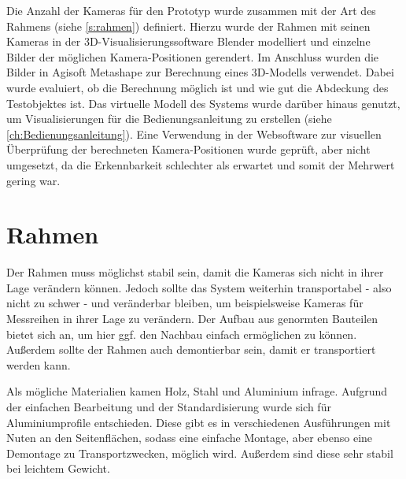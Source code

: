 \documentclass[./00PhotoBox.tex]{subfiles}
\begin{document}
Die Anzahl der Kameras für den Prototyp wurde zusammen mit der Art des Rahmens (siehe \autoref{s:rahmen}) definiert. Hierzu wurde der Rahmen mit seinen Kameras in der 3D-Visualisierungssoftware Blender modelliert und einzelne Bilder der möglichen Kamera-Positionen gerendert. Im Anschluss wurden die Bilder in Agisoft Metashape zur Berechnung eines 3D-Modells verwendet. Dabei wurde evaluiert, ob die Berechnung möglich ist und wie gut die Abdeckung des Testobjektes ist. Das virtuelle Modell des Systems wurde darüber hinaus genutzt, um Visualisierungen für die Bedienungsanleitung zu erstellen (siehe \autoref{ch:Bedienungsanleitung}). Eine Verwendung in der Websoftware zur visuellen Überprüfung der berechneten Kamera-Positionen wurde geprüft, aber nicht umgesetzt, da die Erkennbarkeit schlechter als erwartet und somit der Mehrwert gering war.

\section{Rahmen}
\label{s:rahmen}

Der Rahmen muss möglichst stabil sein, damit die Kameras sich nicht in ihrer Lage verändern können. Jedoch sollte das System weiterhin transportabel - also nicht zu schwer - und veränderbar bleiben, um beispielsweise Kameras für Messreihen in ihrer Lage zu verändern. Der Aufbau aus genormten Bauteilen bietet sich an, um hier ggf. den Nachbau einfach ermöglichen zu können. Außerdem sollte der Rahmen auch demontierbar sein, damit er transportiert werden kann.

Als mögliche Materialien kamen Holz, Stahl und Aluminium infrage. Aufgrund der einfachen Bearbeitung und der Standardisierung wurde sich für Aluminiumprofile entschieden. Diese gibt es in verschiedenen Ausführungen mit Nuten an den Seitenflächen, sodass eine einfache Montage, aber ebenso eine Demontage zu Transportzwecken, möglich wird. Außerdem sind diese sehr stabil bei leichtem Gewicht.
\end{document}
